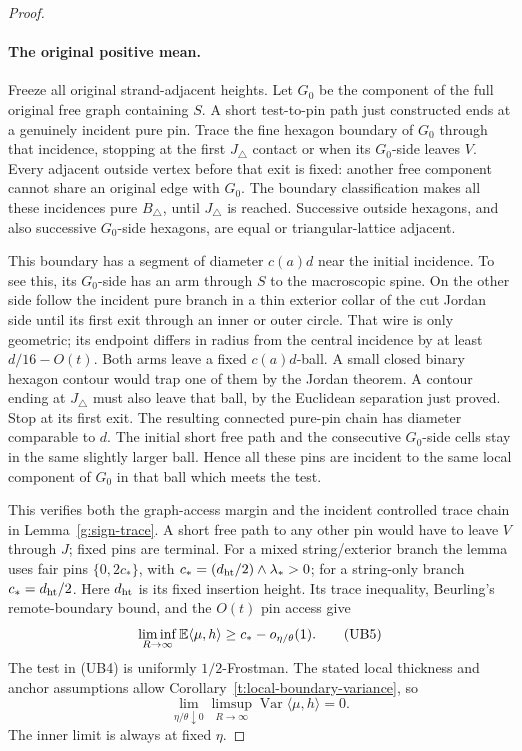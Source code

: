 \begin{proof}
\paragraph{The original positive mean.}
Freeze all original strand-adjacent heights.  Let \(G_0\) be the
component of the full original free graph containing \(S\).  A short
test-to-pin path just constructed ends at a genuinely incident pure
pin.  Trace the fine hexagon boundary of \(G_0\) through that incidence,
stopping at the first \(J_\triangle\) contact or when its \(G_0\)-side
leaves \(V\).  Every adjacent outside
vertex before that exit is fixed: another free component cannot share
an original edge with \(G_0\).  The boundary classification makes all
these incidences pure \(B_\triangle\), until \(J_\triangle\) is reached.
Successive outside hexagons, and also successive \(G_0\)-side hexagons,
are equal or triangular-lattice adjacent.

This boundary has a segment of diameter \(c(a)d\) near the initial
incidence.  To see this, its \(G_0\)-side has an arm through \(S\)
to the macroscopic spine.  On the other side follow the incident
pure branch in a thin exterior collar of the cut Jordan side until
its first exit through an inner or outer circle.  That wire is only
geometric; its endpoint differs in radius from the central incidence
by at least \(d/16-O(t)\).  Both arms leave a fixed \(c(a)d\)-ball.
A small closed binary hexagon contour would trap one of them by the
Jordan theorem.  A contour ending at \(J_\triangle\) must also leave
that ball, by the Euclidean separation just proved.  Stop at its
first exit.  The resulting connected pure-pin chain has diameter
comparable to \(d\).  The initial short free path and the consecutive
\(G_0\)-side cells stay in the same slightly larger ball.  Hence all
these pins are incident to the same local component of \(G_0\) in
that ball which meets the test.

This verifies both the graph-access margin and the incident controlled
trace chain in Lemma~\ref{g:sign-trace}.  A short free path to any other
pin would have to leave \(V\) through \(J\); fixed pins are terminal.
For a mixed string/exterior branch the lemma uses fair pins
\(\{0,2c_*\}\), with \(c_*=(d_{\rm ht}/2)\wedge\lambda_*>0\);
for a string-only branch \(c_*=d_{\rm ht}/2\).  Here \(d_{\rm ht}\)
is its fixed insertion height.  Its trace inequality, Beurling's
remote-boundary bound, and the \(O(t)\) pin access give
\[
 \liminf_{R\to\infty}\mathbb E\langle\mu,h\rangle
       \ge c_*-o_{\eta/\theta}(1).                               \tag{UB5}
\]
The test in (UB4) is uniformly \(1/2\)-Frostman.  The stated local
thickness and anchor assumptions allow
Corollary~\ref{t:local-boundary-variance}, so
\[
 \lim_{\eta/\theta\downarrow0}\limsup_{R\to\infty}
       \operatorname{Var}\langle\mu,h\rangle=0.                  \tag{UB6}
\]
The inner limit is always at fixed \(\eta\).


\end{proof}
